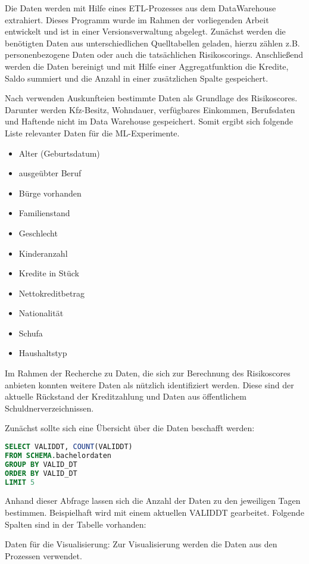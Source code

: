 Die Daten werden mit Hilfe eines ETL-Prozesses aus dem DataWarehouse extrahiert. 
Dieses Programm wurde im Rahmen der vorliegenden Arbeit entwickelt und ist in einer Versionsverwaltung abgelegt. 
Zunächst werden die benötigten Daten aus unterschiedlichen Quelltabellen geladen, hierzu zählen z.B. personenbezogene Daten oder auch die tatsächlichen Risikoscorings. 
Anschließend werden die Daten bereinigt und mit Hilfe einer Aggregatfunktion die Kredite, Saldo summiert und die Anzahl in einer zusätzlichen Spalte gespeichert.


Nach \cite{sokol2005} verwenden Auskunfteien bestimmte Daten als Grundlage des Risikoscores. 
Darunter werden Kfz-Besitz, Wohndauer, verfügbares Einkommen, Berufsdaten und Haftende nicht im Data Warehouse gespeichert. 
Somit ergibt sich folgende Liste relevanter Daten für die ML-Experimente. 

\begin{itemize}
 \item Alter (Geburtsdatum)
 \item ausgeübter Beruf
 \item Bürge vorhanden
 \item Familienstand
 \item Geschlecht
 \item Kinderanzahl
 \item Kredite in Stück 
 \item Nettokreditbetrag 
 \item Nationalität
 \item Schufa
 \item Haushaltstyp
\end{itemize}


Im Rahmen der Recherche zu Daten, die sich zur Berechnung des Risikoscores anbieten konnten weitere Daten als nützlich identifiziert werden. 
Diese sind der aktuelle Rückstand der Kreditzahlung und Daten aus öffentlichem Schuldnerverzeichnissen.





Zunächst sollte sich eine Übersicht über die Daten beschafft werden:


\begin{lstlisting}[language=SQL,caption={Überblick über die Daten},captionpos=b]
SELECT VALIDDT, COUNT(VALIDDT) 
FROM SCHEMA.bachelordaten 
GROUP BY VALID_DT 
ORDER BY VALID_DT
LIMIT 5
\end{lstlisting}
Anhand dieser Abfrage lassen sich die Anzahl der Daten zu den jeweiligen Tagen bestimmen. 
Beispielhaft wird mit einem aktuellen VALIDDT gearbeitet. 
Folgende Spalten sind in der Tabelle vorhanden:



Daten für die Visualisierung:
Zur Visualisierung werden die Daten aus den Prozessen verwendet. 




